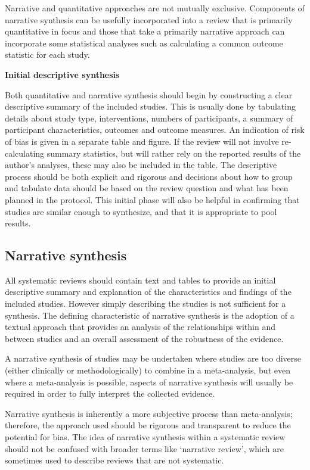 \documentclass[
  11pt,
  a4paper,
  DIV=11,
  numbers=noendperiod]{scrreprt}
\begin{document}
Narrative and quantitative approaches are not mutually exclusive.
Components of narrative synthesis can be usefully incorporated into a
review that is primarily quantitative in focus and those that take a
primarily narrative approach can incorporate some statistical analyses
such as calculating a common outcome statistic for each study.

\textbf{Initial descriptive synthesis}

Both quantitative and narrative synthesis should begin by constructing a
clear descriptive summary of the included studies. This is usually done
by tabulating details about study type, interventions, numbers of
participants, a summary of participant characteristics, outcomes and
outcome measures. An indication of risk of bias is given in a separate
table and figure. If the review will not involve re-calculating summary
statistics, but will rather rely on the reported results of the author's
analyses, these may also be included in the table. The descriptive
process should be both explicit and rigorous and decisions about how to
group and tabulate data should be based on the review question and what
has been planned in the protocol. This initial phase will also be
helpful in confirming that studies are similar enough to synthesize, and
that it is appropriate to pool results.

\subsection{Narrative synthesis}\label{narrative-synthesis}

All systematic reviews should contain text and tables to provide an
initial descriptive summary and explanation of the characteristics and
findings of the included studies. However simply describing the studies
is not sufficient for a synthesis. The defining characteristic of
narrative synthesis is the adoption of a textual approach that provides
an analysis of the relationships within and between studies and an
overall assessment of the robustness of the evidence.

A narrative synthesis of studies may be undertaken where studies are too
diverse (either clinically or methodologically) to combine in a
meta-analysis, but even where a meta-analysis is possible, aspects of
narrative synthesis will usually be required in order to fully interpret
the collected evidence.

Narrative synthesis is inherently a more subjective process than
meta-analysis; therefore, the approach used should be rigorous and
transparent to reduce the potential for bias. The idea of narrative
synthesis within a systematic review should not be confused with broader
terms like `narrative review', which are sometimes used to describe
reviews that are not systematic.
\end{document}
